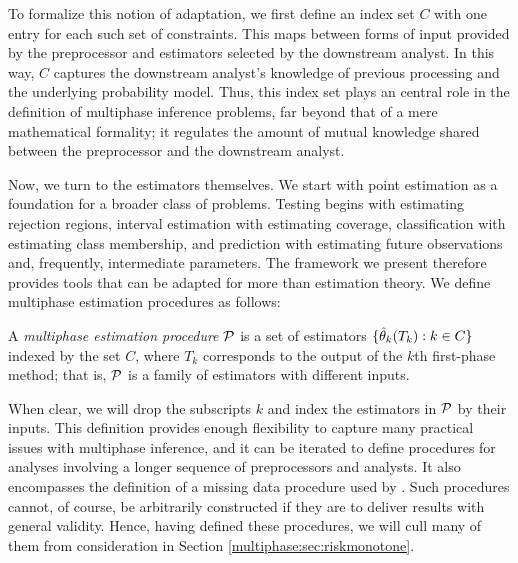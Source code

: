 To formalize this notion of adaptation, we first define an index set $C$ with one entry for each such set of constraints.
This maps between forms of input provided by the preprocessor and estimators selected by the downstream analyst.
In this way, $C$ captures the downstream analyst's knowledge of previous processing and the underlying probability model.
Thus, this index set plays an central role in the definition of multiphase inference problems, far beyond that of a mere mathematical formality; it regulates the amount of mutual knowledge shared between the preprocessor and the downstream analyst.

Now, we turn to the estimators themselves.
We start with point estimation as a foundation for a broader class of problems.
Testing begins with estimating rejection regions, interval estimation with estimating coverage, classification with estimating class membership, and prediction with estimating future observations and, frequently, intermediate parameters.
The framework we present therefore provides tools that can be adapted for more than estimation theory.
We define multiphase estimation procedures as follows:
%
\begin{definition}
A \emph{multiphase estimation procedure} $\mathcal{P}$ is a set of estimators $\{\hat{\theta}_k(T_k) : k \in C \}$ indexed by the set $C$, where $T_k$ corresponds to the output of the $k$th first-phase method; that is, $\mathcal{P}$ is a family of estimators with different inputs.
\end{definition}
%
When clear, we will drop the subscripts $k$ and index the estimators in $\mathcal{P}$ by their inputs.
This definition provides enough flexibility to capture many practical issues with multiphase inference, and it can be iterated to define procedures for analyses involving a longer sequence of preprocessors and analysts.
It also encompasses the  definition of a missing data procedure used by \citet{Meng1994}.
Such procedures cannot, of course, be arbitrarily constructed if they are to deliver results with general validity.
Hence, having defined these procedures, we will cull many of them from consideration in Section \ref{multiphase:sec:riskmonotone}.

